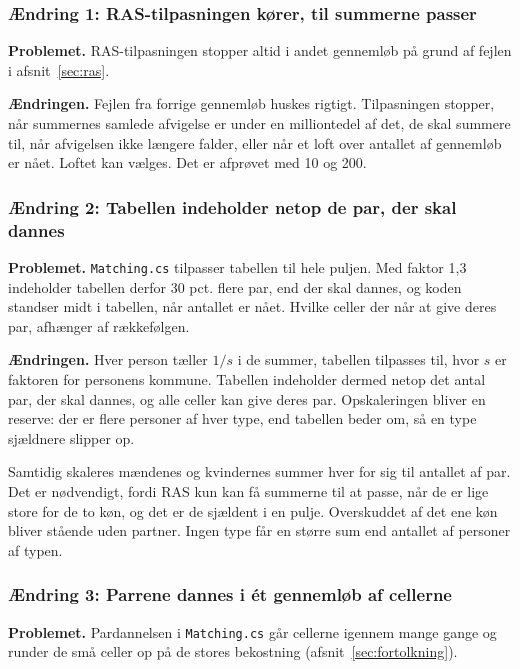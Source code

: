 \documentclass[11pt,a4paper]{article}
\newcommand{\kode}[1]{\texttt{#1}}
\begin{document}
\subsubsection*{Ændring 1: RAS-tilpasningen kører, til summerne passer}

\textbf{Problemet.} RAS-tilpasningen stopper altid i andet gennemløb på grund af fejlen i
afsnit~\ref{sec:ras}.

\textbf{Ændringen.} Fejlen fra forrige gennemløb huskes rigtigt. Tilpasningen stopper, når summernes
samlede afvigelse er under en milliontedel af det, de skal summere til, når afvigelsen ikke længere
falder, eller når
et loft over antallet af gennemløb er nået. Loftet kan vælges. Det er afprøvet med 10 og 200.

\subsubsection*{Ændring 2: Tabellen indeholder netop de par, der skal dannes}

\textbf{Problemet.} \kode{Matching.cs} tilpasser tabellen til hele puljen. Med faktor 1,3 indeholder
tabellen derfor 30 pct. flere par, end der skal dannes, og koden standser midt i tabellen, når
antallet er nået. Hvilke celler der når at give deres par, afhænger af rækkefølgen.

\textbf{Ændringen.} Hver person tæller $1/s$ i de summer, tabellen tilpasses til, hvor $s$ er
faktoren for personens kommune. Tabellen indeholder dermed netop det antal par, der skal dannes, og
alle celler kan give deres par. Opskaleringen bliver en reserve: der er flere personer af hver
type, end tabellen beder om, så en type sjældnere slipper op.

Samtidig skaleres mændenes og kvindernes summer hver for sig til antallet af par. Det er nødvendigt,
fordi RAS kun kan få summerne til at passe, når de er lige store for de to køn, og det er de sjældent
i en pulje. Overskuddet af det ene køn bliver stående uden partner. Ingen type får en større sum end
antallet af personer af typen.

\subsubsection*{Ændring 3: Parrene dannes i ét gennemløb af cellerne}

\textbf{Problemet.} Pardannelsen i \kode{Matching.cs} går cellerne igennem mange gange og runder de
små celler op på de stores bekostning (afsnit~\ref{sec:fortolkning}).
\end{document}
